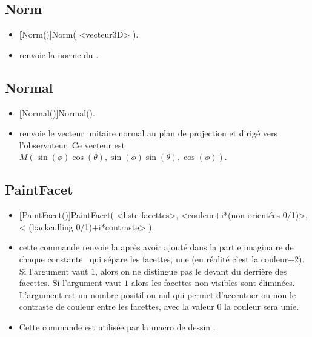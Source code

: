 \subsection{Norm}\label{cmdNorm}
\begin{itemize}
 \item \util \textbf[Norm()]{Norm( <vecteur3D> )}.
 \item \desc renvoie la norme du .
\end{itemize}

\subsection{Normal}\label{cmdNormal}
\begin{itemize}
 \item \util \textbf[Normal()]{Normal()}.
 \item \desc renvoie le vecteur unitaire normal au plan de projection et dirigé vers l'observateur. Ce vecteur est $M(\sin(\phi)\cos(\theta), \sin(\phi)\sin(\theta), \cos(\phi))$.
\end{itemize}


\subsection{PaintFacet}\label{cmdPaintFacet}
\begin{itemize}
 \item \util \textbf[PaintFacet()]{PaintFacet( <liste facettes>, <couleur+i*(non orientées 0/1)>, < (backculling 0/1)+i*contraste> )}.
 \item \desc cette commande renvoie la  après avoir ajouté dans la partie imaginaire de chaque constante \jump\ qui sépare les facettes, une  (en réalité c'est la couleur+2). Si l'argument  vaut $1$, alors on ne distingue pas le devant du derrière des facettes. Si l'argument  vaut $1$ alors les facettes non visibles sont éliminées. L'argument  est un nombre positif ou nul qui permet d'accentuer ou non le contraste de couleur entre les facettes, avec la valeur $0$ la couleur sera unie. 
 \item Cette commande est utilisée par la macro de dessin .
\end{itemize}

